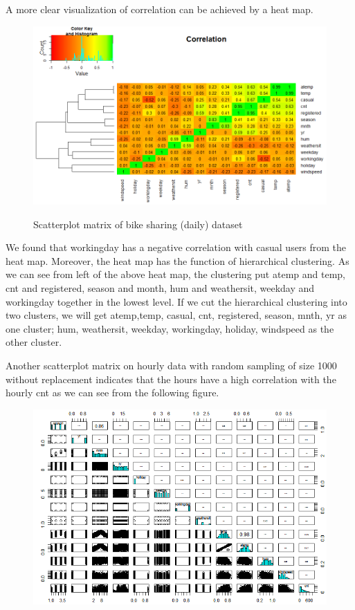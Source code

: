 \documentclass[12pt]{article}
\begin{document}
	A more clear visualization of correlation can be achieved by a heat map. 
		\begin{figure}[H]
			\includegraphics[scale=0.6]{figures/correlation.png}
			\label{fig:correlation}
			\caption{Scatterplot matrix of bike sharing (daily) dataset}
		\end{figure}
   We found that workingday has a negative correlation with casual users from the heat map. 
   Moreover, the heat map has the function of hierarchical clustering. As we can see from left of the above heat map, the clustering put atemp and temp, cnt and registered, season and month, hum and weathersit, weekday and workingday together in the lowest level.  If we cut the hierarchical clustering into two clusters, we will get atemp,temp, casual, cnt, registered, season, mnth, yr as one cluster; hum, weathersit, weekday, workingday, holiday, windspeed as the other cluster.
   
	Another scatterplot matrix on hourly data with random sampling of size 1000 without replacement indicates that the hours have a high correlation with the hourly cnt as we can see from the following figure. 
	\begin{figure}[H]
		\includegraphics[scale=0.8]{figures/scatterplot_col_season.png}
	\end{figure}
	
\end{document}
